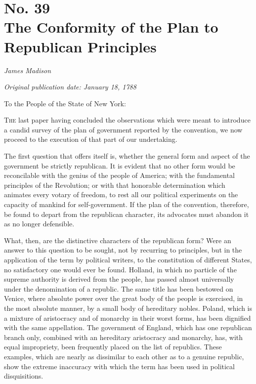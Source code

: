 \chapter[No. 39: The Conformity of the Plan to Republican Principles]{No. 39\\ {\small The Conformity of the Plan to Republican Principles}}

\textit{James Madison}

\textit{Original publication date: January 18, 1788}
\vspace{1cm}

To the People of the State of New York:
\vspace{.4cm}

\textsc{The} last paper having concluded the observations which were meant to introduce a candid survey of the plan of government reported by the convention, we now proceed to the execution of that part of our undertaking.

The first question that offers itself is, whether the general form and aspect of the government be strictly republican. 
It is evident that no other form would be reconcilable with the genius of the people of America; with the fundamental principles of the Revolution; or with that honorable determination which animates every votary of freedom, to rest all our political experiments on the capacity of mankind for self-government. 
If the plan of the convention, therefore, be found to depart from the republican character, its advocates must abandon it as no longer defensible.

What, then, are the distinctive characters of the republican form? 
Were an answer to this question to be sought, not by recurring to principles, but in the application of the term by political writers, to the constitution of different States, no satisfactory one would ever be found. 
Holland, in which no particle of the supreme authority is derived from the people, has passed almost universally under the denomination of a republic. 
The same title has been bestowed on Venice, where absolute power over the great body of the people is exercised, in the most absolute manner, by a small body of hereditary nobles. 
Poland, which is a mixture of aristocracy and of monarchy in their worst forms, has been dignified with the same appellation. 
The government of England, which has one republican branch only, combined with an hereditary aristocracy and monarchy, has, with equal impropriety, been frequently placed on the list of republics. 
These examples, which are nearly as dissimilar to each other as to a genuine republic, show the extreme inaccuracy with which the term has been used in political disquisitions.


